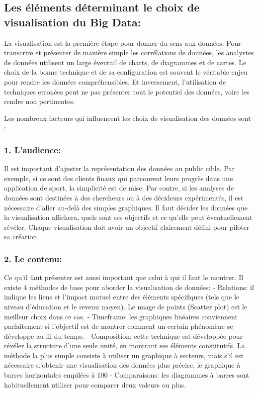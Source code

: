 \documentclass[french, a4paper, 12pt]{report}
\begin{document}
\subsection{Les éléments déterminant le choix de visualisation du Big Data:}
La visualisation est la première étape pour donner du sens aux données. Pour transcrire et présenter de manière simple les corrélations de données, les analystes de données utilisent un large éventail de charts, de diagrammes et de cartes. Le choix de la bonne technique et de sa configuration est souvent le véritable enjeu pour rendre les données compréhensibles. Et inversement, l’utilisation de techniques erronées peut ne pas présenter tout le potentiel des données, voire les rendre non pertinentes.

Les nombreux facteurs qui influencent les choix de visualisation des données sont :
\subsubsection{1. L’audience:}
Il est important d’ajuster la représentation des données au public cible. Par exemple, si ce sont des clients finaux qui parcourent leurs progrès dans une application de sport, la simplicité est de mise. Par contre, si les analyses de données sont destinées à des chercheurs ou à des décideurs expérimentés, il est nécessaire d’aller au-delà des simples graphiques.
Il faut décider les données que la visualisation affichera, quels sont ses objectifs et ce qu’elle peut éventuellement révéler. Chaque visualisation doit avoir un objectif clairement défini pour piloter sa création.
\subsubsection{2. Le contenu:}
Ce qu’il faut présenter est aussi important que celui à qui il faut le montrer. Il existe 4 méthodes de base pour aborder la visualisation de données:
- Relations: il indique les liens et l'impact mutuel entre des éléments spécifiques (tels que le niveau d'éducation et le revenu moyen). Le nuage de points (Scatter plot) est le meilleur choix dans ce cas.
- Timeframe: les graphiques linéaires conviennent parfaitement si l’objectif est de montrer comment un certain phénomène se développe au fil du temps.
- Composition: cette technique est développée pour révéler la structure d'une seule unité, en montrant ses éléments constitutifs. La méthode la plus simple consiste à utiliser un graphique à secteurs, mais s’il est nécessaire d’obtenir une visualisation des données plus précise, le graphique à barres horizontales empilées à 100%
- Comparaisons: les diagrammes à barres sont habituellement utiliser pour  comparer deux valeurs ou plus.
\end{document}
